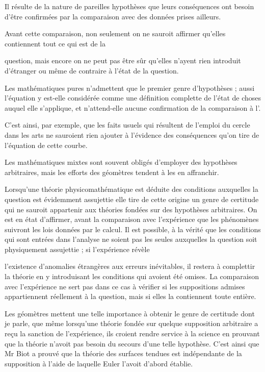 \documentclass[11pt,a4paper]{article}
\begin{document}
Il résulte de la nature de pareilles hypothèses que leurs conséquences ont
besoin d'être confirmées par la comparaison avec des données prises ailleurs.

Avant cette comparaison, non seulement on ne sauroit affirmer qu'elles
contiennent tout ce qui est de la

question, mais encore on ne peut pas être sûr qu'elles n'ayent rien introduit
d'étranger ou même de contraire à l'état de la question.

Les mathématiques pures n'admettent que le premier genre d'hypothèses ; aussi
l'équation y est-elle considérée comme une définition complette de l'état de
choses auquel elle s'applique, et n'attend-elle aucune confirmation de la
comparaison à l'.

C'est ainsi, par exemple, que les faits usuels qui résultent de l'emploi du
cercle dans les arts ne sauroient rien ajouter à l'évidence des conséquences
qu'on tire de l'équation de cette courbe.

Les mathématiques mixtes sont souvent obligés d'employer des hypothèses
arbitraires, mais les efforts des géomètres tendent à les en affranchir.

Lorsqu'une théorie physicomathématique est déduite des conditions auxquelles
la question est évidemment assujettie elle tire de cette origine un genre de
certitude qui ne sauroit appartenir aux théories fondées sur des hypothèses
arbitraires. On est en état d'affirmer, avant la comparaison avec l'expérience
que les phénomènes suivront les lois données par le calcul. Il est possible, à
la vérité que les conditions qui sont entrées dans l'analyse ne soient pas les
seules auxquelles la question soit physiquement assujettie ; si l'expérience
révèle

l'existence d'anomalies étrangères aux erreurs inévitables, il restera à
complettir la théorie en y introduisant les conditions qui avoient été omises.
La comparaison avec l'expérience ne sert pas dans ce cas à vérifier si les
suppositions admises appartiennent réellement à la question, mais si elles la
contiennent toute entière.

Les géomètres mettent une telle importance à obtenir le genre de certitude
dont je parle, que même lorsqu'une théorie fondée sur quelque supposition
arbitraire a reçu la sanction de l'expérience, ils croient rendre service à la
science en prouvant que la théorie n'avoit pas besoin du secours d'une telle
hypothèse. C'est ainsi que Mr Biot a prouvé que la théorie des surfaces
tendues est indépendante de la supposition à l'aide de laquelle Euler l'avoit
d'abord établie.
\end{document}
